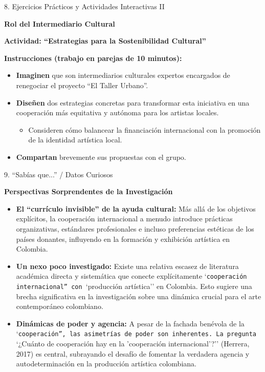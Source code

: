 \documentclass[aspectratio=169]{beamer}
\begin{document}
\begin{frame}[fragile]{8. Ejercicios Prácticos y Actividades Interactivas II}


\textbf{Rol del Intermediario Cultural}

\textbf{Actividad: ``Estrategias para la Sostenibilidad Cultural''}

\textbf{Instrucciones (trabajo en parejas de 10 minutos):}

\begin{itemize}
  \item \textbf{Imaginen} que son intermediarios culturales expertos encargados de renegociar el proyecto ``El Taller Urbano''.
  \item \textbf{Diseñen} dos estrategias concretas para transformar esta iniciativa en una cooperación más equitativa y autónoma para los artistas locales.
  \begin{itemize}
    \item Consideren cómo balancear la financiación internacional con la promoción de la identidad artística local.
  \end{itemize}
  \item \textbf{Compartan} brevemente sus propuestas con el grupo.
\end{itemize}
\end{frame}



\begin{frame}[fragile]{9. ``Sabías que...'' / Datos Curiosos}


\textbf{Perspectivas Sorprendentes de la Investigación}

\begin{itemize}
  \item \textbf{El ``currículo invisible'' de la ayuda cultural:} Más allá de los objetivos explícitos, la cooperación internacional a menudo introduce prácticas organizativas, estándares profesionales e incluso preferencias estéticas de los países donantes, influyendo en la formación y exhibición artística en Colombia.
  \item \textbf{Un nexo poco investigado:} Existe una relativa escasez de literatura académica directa y sistemática que conecte explícitamente `\texttt{cooperación internacional'' con }`producción artística'' en Colombia. Esto sugiere una brecha significativa en la investigación sobre una dinámica crucial para el arte contemporáneo colombiano.
  \item \textbf{Dinámicas de poder y agencia:} A pesar de la fachada benévola de la `\texttt{cooperación'', las asimetrías de poder son inherentes. La pregunta }`¿Cuánto de cooperación hay en la 'cooperación internacional'?'' (Herrera, 2017) es central, subrayando el desafío de fomentar la verdadera agencia y autodeterminación en la producción artística colombiana.
\end{itemize}
\end{frame}
\end{document}
